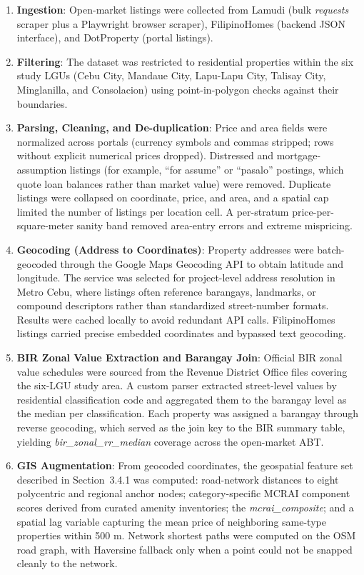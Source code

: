 \begin{enumerate}
\item \textbf{Ingestion}: Open-market listings were collected from Lamudi (bulk \emph{requests} scraper plus a Playwright browser scraper), FilipinoHomes (backend JSON interface), and DotProperty (portal listings).
\item \textbf{Filtering}: The dataset was restricted to residential properties within the six study LGUs (Cebu City, Mandaue City, Lapu-Lapu City, Talisay City, Minglanilla, and Consolacion) using point-in-polygon checks against their boundaries.
\item \textbf{Parsing, Cleaning, and De-duplication}: Price and area fields were normalized across portals (currency symbols and commas stripped; rows without explicit numerical prices dropped). Distressed and mortgage-assumption listings (for example, ``for assume'' or ``pasalo'' postings, which quote loan balances rather than market value) were removed. Duplicate listings were collapsed on coordinate, price, and area, and a spatial cap limited the number of listings per location cell. A per-stratum price-per-square-meter sanity band removed area-entry errors and extreme mispricing.
\item \textbf{Geocoding (Address to Coordinates)}: Property addresses were batch-geocoded through the Google Maps Geocoding API to obtain latitude and longitude. The service was selected for project-level address resolution in Metro Cebu, where listings often reference barangays, landmarks, or compound descriptors rather than standardized street-number formats. Results were cached locally to avoid redundant API calls. FilipinoHomes listings carried precise embedded coordinates and bypassed text geocoding.
\item \textbf{BIR Zonal Value Extraction and Barangay Join}: Official BIR zonal value schedules were sourced from the Revenue District Office files covering the six-LGU study area. A custom parser extracted street-level values by residential classification code and aggregated them to the barangay level as the median per classification. Each property was assigned a barangay through reverse geocoding, which served as the join key to the BIR summary table, yielding \emph{bir\_zonal\_rr\_median} coverage across the open-market ABT.
\item \textbf{GIS Augmentation}: From geocoded coordinates, the geospatial feature set described in Section~3.4.1 was computed: road-network distances to eight polycentric and regional anchor nodes; category-specific MCRAI component scores derived from curated amenity inventories; the \emph{mcrai\_composite}; and a spatial lag variable capturing the mean price of neighboring same-type properties within 500 m. Network shortest paths were computed on the OSM road graph, with Haversine fallback only when a point could not be snapped cleanly to the network.

\end{enumerate}
